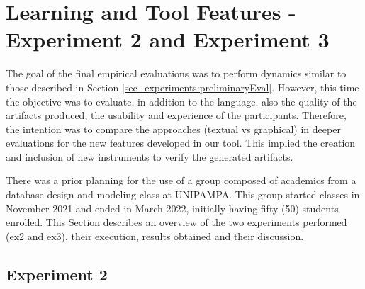 \section{Learning and Tool Features - Experiment 2 and Experiment 3}
\label{sec_experiments:finalEval}

The goal of the final empirical evaluations was to perform dynamics similar to those described in Section \ref{sec_experiments:preliminaryEval}.
However, this time the objective was to evaluate, in addition to the language, also the quality of the artifacts produced, the usability and experience of the participants.
Therefore, the intention was to compare the approaches (textual vs graphical) in deeper evaluations for the new features developed in our tool.
This implied the creation and inclusion of new instruments to verify the generated artifacts.

There was a prior planning for the use of a group composed of academics from a database design and modeling class at UNIPAMPA.
This group started classes in November 2021 and ended in March 2022, initially having fifty (50) students enrolled.
This Section describes an overview of the two experiments performed (\ac{ex2} and \ac{ex3}), their execution, results obtained and their discussion.


\subsection{Experiment 2}
\label{ssec_experiments:Experiment2}

